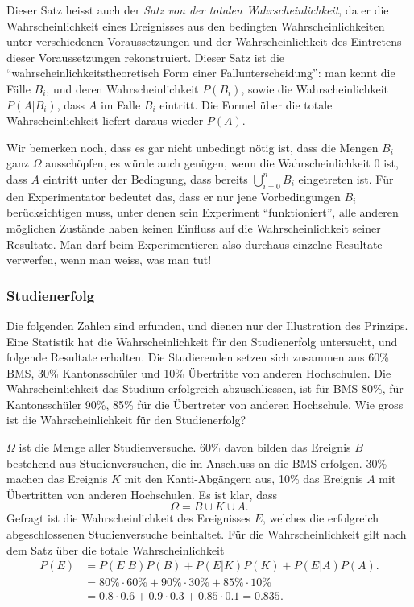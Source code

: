 Dieser Satz heisst auch der {\em Satz von der totalen Wahrscheinlichkeit},
da er die Wahrscheinlichkeit eines Ereignisses aus den bedingten
Wahrscheinlichkeiten unter verschiedenen Voraussetzungen und der
Wahrscheinlichkeit des Eintretens dieser Voraussetzungen rekonstruiert.
Dieser Satz ist die ``wahrscheinlichkeitstheoretisch Form einer
Fallunterscheidung'': man kennt die Fälle $B_i$, und deren Wahrscheinlichkeit
$P(B_i)$, sowie die Wahrscheinlichkeit $P(A|B_i)$, dass $A$ im Falle 
$B_i$ eintritt.
Die Formel über die totale Wahrscheinlichkeit
liefert daraus wieder $P(A)$.

Wir bemerken noch, dass es gar nicht unbedingt nötig ist, dass die Mengen
$B_i$ ganz $\Omega$ ausschöpfen, es würde auch
genügen, wenn die Wahrscheinlichkeit $0$ ist, dass $A$ eintritt
unter der Bedingung,
dass bereits $\bigcup_{i=0}^{n}B_i$ eingetreten ist.
Für den
Experimentator bedeutet das, dass er nur jene Vorbedingungen $B_i$
berücksichtigen muss, unter denen sein Experiment ``funktioniert'',
alle anderen möglichen Zustände haben keinen Einfluss auf
die Wahrscheinlichkeit seiner Resultate.
Man darf beim Experimentieren also durchaus einzelne Resultate
verwerfen, wenn man weiss, was man tut!

\subsubsection{Studienerfolg}
Die folgenden Zahlen sind erfunden, und dienen nur der Illustration
des Prinzips.
Eine Statistik hat die Wahrscheinlichkeit für den
Studienerfolg untersucht, und folgende Resultate erhalten.
Die Studierenden setzen sich zusammen aus 60\% BMS, 30\% Kantonsschüler
und 10\% Übertritte von anderen Hochschulen.
Die Wahrscheinlichkeit
das Studium erfolgreich abzuschliessen, ist für BMS 80\%,
für Kantonsschüler 90\%, 85\% für die Übertreter von anderen
Hochschule.
Wie gross ist die Wahrscheinlichkeit für den Studienerfolg?

$\Omega$ ist die Menge aller Studienversuche.
60\% davon bilden das
Ereignis $B$ bestehend aus Studienversuchen, die im Anschluss an die BMS
erfolgen.
30\% machen das Ereignis $K$ mit den Kanti-Abgängern aus,
10\% das Ereignis $A$ mit Übertritten von anderen Hochschulen.
Es ist klar, dass 
\[
\Omega = B \cup K\cup A.
\]
Gefragt ist die Wahrscheinlichkeit des Ereignisses $E$, welches
die erfolgreich abgeschlossenen Studienversuche beinhaltet.
Für die Wahrscheinlichkeit gilt nach dem Satz über die totale
Wahrscheinlichkeit
\begin{align*}
P(E)&=P(E|B)P(B)+P(E|K)P(K)+P(E|A)P(A).
\\
    &= 80\%\cdot 60\%
     + 90\%\cdot 30\%
     + 85\%\cdot 10\%
\\
&=0.8\cdot 0.6 + 0.9 \cdot 0.3 + 0.85 \cdot 0.1 = 0.835.
\end{align*}


